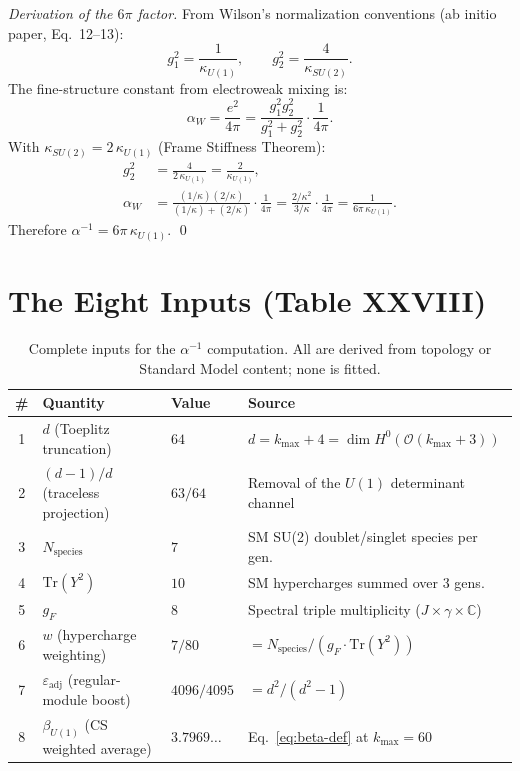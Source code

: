 \documentclass[11pt,a4paper]{article}
\theoremstyle{definition}
\begin{document}
\begin{proof}[Derivation of the $6\pi$ factor]
From Wilson's normalization conventions (ab initio paper, Eq.~12--13):
\begin{equation}
g_1^2 = \frac{1}{\kappa_{U(1)}}, \qquad g_2^2 = \frac{4}{\kappa_{SU(2)}}.
\end{equation}
The fine-structure constant from electroweak mixing is:
\begin{equation}
\alpha_W = \frac{e^2}{4\pi} = \frac{g_1^2 g_2^2}{g_1^2 + g_2^2} \cdot \frac{1}{4\pi}.
\end{equation}
With $\kappa_{SU(2)} = 2\,\kappa_{U(1)}$ (Frame Stiffness Theorem):
\begin{align}
g_2^2 &= \frac{4}{2\,\kappa_{U(1)}} = \frac{2}{\kappa_{U(1)}}, \\[6pt]
\alpha_W &= \frac{(1/\kappa)(2/\kappa)}{(1/\kappa)+(2/\kappa)} \cdot \frac{1}{4\pi}
= \frac{2/\kappa^2}{3/\kappa} \cdot \frac{1}{4\pi}
= \frac{1}{6\pi\,\kappa_{U(1)}}.
\end{align}
Therefore $\alpha^{-1} = 6\pi\,\kappa_{U(1)}$. \qed
\end{proof}

\section{The Eight Inputs (Table XXVIII)}

\begin{table}[h]
\centering
\caption{Complete inputs for the $\alpha^{-1}$ computation.  All are derived
from topology or Standard Model content; none is fitted.}\label{tab:inputs}
\renewcommand{\arraystretch}{1.4}
\begin{tabular}{clll}
\toprule
\# & Quantity & Value & Source \\
\midrule
1 & $d$ (Toeplitz truncation) & $64$ & $d = k_{\max}+4 = \dim H^0(\mathcal{O}(k_{\max}+3))$ \\
2 & $(d{-}1)/d$ (traceless projection) & $63/64$ & Removal of the $U(1)$ determinant channel \\
3 & $N_{\mathrm{species}}$ & $7$ & SM SU(2) doublet/singlet species per gen. \\
4 & $\mathrm{Tr}(Y^2)$ & $10$ & SM hypercharges summed over 3 gens. \\
5 & $g_F$ & $8$ & Spectral triple multiplicity ($J \times \gamma \times \mathbb{C}$) \\
6 & $w$ (hypercharge weighting) & $7/80$ & $= N_{\mathrm{species}}/(g_F \cdot \mathrm{Tr}(Y^2))$ \\
7 & $\varepsilon_{\mathrm{adj}}$ (regular-module boost) & $4096/4095$ & $= d^2/(d^2-1)$ \\
8 & $\beta_{U(1)}$ (CS weighted average) & $3.7969\ldots$ & Eq.~\eqref{eq:beta-def} at $k_{\max}=60$ \\
\bottomrule
\end{tabular}
\end{table}
\end{document}
